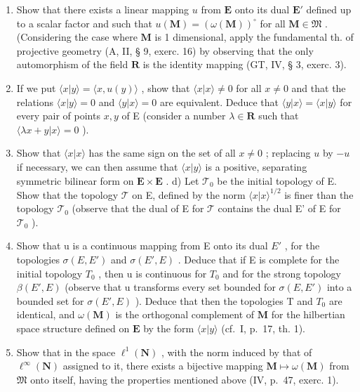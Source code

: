 \begin{enumerate}
\def\labelenumi{\alph{enumi})}
\item
  Show that there exists a linear mapping \(u\) from \(\mathbf{E}\) onto its dual \(\mathbf{E}'\) defined up to a scalar factor and such that \(u(\mathbf{M}) = (\omega(\mathbf{M}))^\circ\) for all \(\mathbf{M} \in \mathfrak{M}\) . (Considering the case where \(\mathbf{M}\) is 1 dimensional, apply the fundamental th. of projective geometry (A, II, § 9, exerc. 16) by observing that the only automorphism of the field \(\mathbf{R}\) is the identity mapping (GT, IV, § 3, exerc. 3).
\item
  If we put \(\langle x|y\rangle = \langle x,u(y)\rangle\) , show that \(\langle x|x\rangle \neq 0\) for all \(x\neq 0\) and that the relations \(\langle x|y\rangle = 0\) and \(\langle y|x\rangle = 0\) are equivalent. Deduce that \(\langle y|x\rangle = \langle x|y\rangle\) for every pair of points \(x,y\) of E (consider a number \(\lambda \in \mathbf{R}\) such that \(\langle \lambda x + y|x\rangle = 0\) ).
\item
  Show that \(\langle x|x\rangle\) has the same sign on the set of all \(x\neq 0\) ; replacing \(u\) by \(-u\) if necessary, we can then assume that \(\langle x|y\rangle\) is a positive, separating symmetric bilinear form on \(\mathbf{E}\times \mathbf{E}\) . d) Let \(\mathcal{T}_0\) be the initial topology of E. Show that the topology \(\mathcal{T}\) on E, defined by the norm \(\langle x|x\rangle^{1 / 2}\) is finer than the topology \(\mathcal{T}_0\) (observe that the dual of E for \(\mathcal{T}\) contains the dual E' of E for \(\mathcal{T}_0\) ).
\item
  Show that u is a continuous mapping from E onto its dual \(E'\) , for the topologies \(\sigma(E, E')\) and \(\sigma(E', E)\) . Deduce that if E is complete for the initial topology \(T_{0}\) , then u is continuous for \(T_{0}\) and for the strong topology \(\beta(E', E)\) (observe that u transforms every set bounded for \(\sigma(E, E')\) into a bounded set for \(\sigma(E', E)\) ). Deduce that then the topologies T and \(T_{0}\) are identical, and \(\omega(\mathbf{M})\) is the orthogonal complement of \(\mathbf{M}\) for the hilbertian space structure defined on \(\mathbf{E}\) by the form \(\langle x|y\rangle\) (cf.~I, p.~17, th. 1).
\item
  Show that in the space \(\ell^{1}(\mathbf{N})\) , with the norm induced by that of \(\ell^{\infty}(\mathbf{N})\) assigned to it, there exists a bijective mapping \(\mathbf{M}\mapsto\omega(\mathbf{M})\) from \(\mathfrak{M}\) onto itself, having the properties mentioned above (IV, p.~47, exerc. 1).
\end{enumerate}

